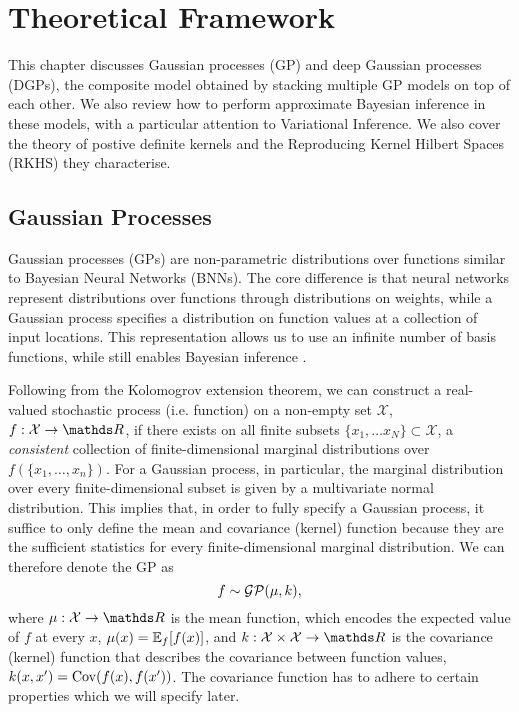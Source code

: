 
\chapter{Theoretical Framework}
\label{chapter:theoretical-framework}

This chapter discusses Gaussian processes (GP) and deep Gaussian processes (DGPs), the composite model obtained by stacking multiple GP models on top of each other. We also review how to perform approximate Bayesian inference in these models, with a particular attention to Variational Inference. We also cover the theory of postive definite kernels and the Reproducing Kernel Hilbert Spaces (RKHS) they characterise.

\section{Gaussian Processes}
\label{sec:chapter1:gp}


Gaussian processes (GPs) \citep{rasmussen2006} are non-parametric distributions over functions similar to Bayesian Neural Networks (BNNs). The core difference is that neural networks represent distributions over functions through distributions on weights, while a Gaussian process specifies a distribution on function values at a collection of input locations. This representation allows us to use an infinite number of basis functions, while still enables Bayesian inference \citep{neal1996bayesian}. 

Following from the Kolomogrov extension theorem, we can construct a real-valued stochastic process (i.e. function) on a non-empty set $\mathcal{X}$, $f: \mathcal{X} \rightarrow \Reals$, if there exists on all finite subsets $\{x_1, \ldots x_N\} \subset \mathcal{X}$, a \emph{consistent} collection of finite-dimensional marginal distributions over $f(\{x_1, \ldots, x_n\})$. For a Gaussian process, in particular, the marginal distribution over every finite-dimensional subset is given by a multivariate normal distribution. This implies that, in order to fully specify a Gaussian process, it suffice to only define the mean and covariance (kernel) function because they are the sufficient statistics for every finite-dimensional marginal distribution. We can therefore denote the GP as
\begin{equation}
  \label{eq:chapter1:def-gp}
  f \sim \mathcal{GP}(\mu, k),
\end{equation}
where $\mu:\mathcal{X}\rightarrow\Reals$ is the mean function, which encodes the expected value of $f$ at every $x$, $\mu(x) = \Exp{f}{f(x)}$, and $k:\mathcal{X} \times \mathcal{X} \rightarrow \Reals$ is the covariance (kernel) function that describes the covariance between function values, $k(x, x') = \Cov\left(f(x), f(x')\right)$. The covariance function has to adhere to certain properties which we will specify later.

